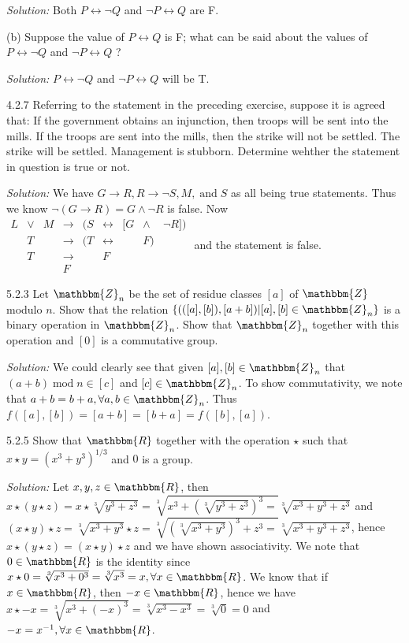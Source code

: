 \documentclass{letter}
\newcommand{\tmem}[1]{{\em #1\/}}
\newcommand{\tmop}[1]{\ensuremath{\operatorname{#1}}}
\begin{document}
{\tmem{Solution:}} Both $P \leftrightarrow \neg Q$ and $\neg P \leftrightarrow
Q$ are F.

(b) Suppose the value of $P \leftrightarrow Q$ is F; what can be said about
the values of $P \leftrightarrow \neg Q$ and $\neg P \leftrightarrow Q$ ?

{\tmem{Solution:}} $P \leftrightarrow \neg Q$ and $\neg P \leftrightarrow Q$
will be T.

4.2.7 Referring to the statement in the preceding exercise, suppose it is
agreed that: If the government obtains an injunction, then troops will be sent
into the mills. If the troops are sent into the mills, then the strike will
not be settled. The strike will be settled. Management is stubborn. Determine
wehther the statement in question is true or not.

{\tmem{Solution:}} We have $G \rightarrow R, R \rightarrow \neg S, M,
\tmop{and} S$ as all being true statements. Thus we know $\neg (G \rightarrow
R) = G \wedge \neg R$ is false. Now $\begin{array}{lllllllll}
  L & \vee & M & \rightarrow & (S & \leftrightarrow & [G & \wedge & \neg R])\\
  & T &  & \rightarrow & (T & \leftrightarrow &  & F) & \\
  & T &  & \rightarrow &  & F &  &  & \\
  &  &  & F &  &  &  &  & 
\end{array}$ and the statement is false.

5.2.3 Let $\mathbbm{Z}_n$ be the set of residue classes $[a]$ of $\mathbbm{Z}$
modulo $n$. Show that the relation $\{(([a], [b]), [a + b]) | [a], [b] \in
\mathbbm{Z}_n \}$ is a binary operation in $\mathbbm{Z}_n$. Show that
$\mathbbm{Z}_n$ together with this operation and $[0]$ is a commutative group.

{\tmem{Solution:}} We could clearly see that given $[a], [b] \in
\mathbbm{Z}_n$ that $(a + b) \tmop{mod} n \in [c]$ and $[c] \in
\mathbbm{Z}_n$. To show commutativity, we note that $a + b = b + a, \forall a,
b \in \mathbbm{Z}_n$. Thus $f ([a], [b]) = [a + b] = [b + a] = f ([b], [a])$.

5.2.5 Show that $\mathbbm{R}$ together with the operation $\star$ such that
$x \star y = (x^3 + y^3)^{1 / 3}$ and $0$ is a group.

{\tmem{Solution:}} Let $x, y, z \in \mathbbm{R}$, then $x \star (y \star z) =
x \star \sqrt[3]{y^3 + z^3} = \sqrt[3]{x^3 + ( \sqrt[3]{y^3 + z^3})^3 =}
\sqrt[3]{x^3 + y^3 + z^3}^{}$ and $(x \star y) \star z = \sqrt[3]{x^3 + y^3}
\star z = \sqrt[3]{( \sqrt[3]{x^3 + y^3})^3 + z^3 =} \sqrt[3]{x^3 + y^3 +
z^3}^{}$, hence $x \star (y \star z) = (x \star y) \star z$ and we have shown
associativity. We note that $0 \in \mathbbm{R}$ is the identity since $x \star
0 = \sqrt[3]{x^3 + 0^3} = \sqrt[3]{x^3} = x, \forall x \in \mathbbm{R}$. We
know that if $x \in \mathbbm{R}$, then $- x \in \mathbbm{R}$, hence we have $x
\star - x = \sqrt[3]{x^3 + (- x)^3} = \sqrt[3]{x^3 - x^3} = \sqrt[3]{0} = 0$
and $- x = x^{- 1}, \forall x \in \mathbbm{R}$.
\end{document}

